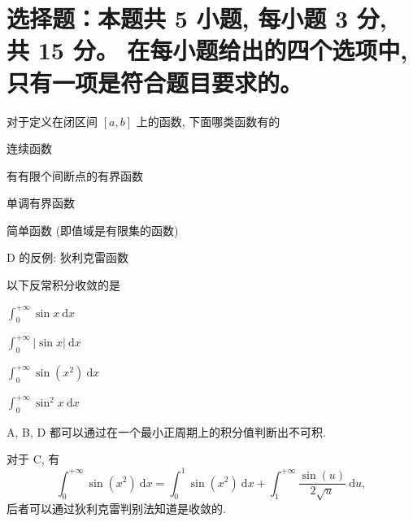 \fi




\section{%
  选择题：本题共 5 小题, 每小题 3 分, 共 15 分。
  在每小题给出的四个选项中, 只有一项是符合题目要求的。
}


\begin{question}
对于定义在闭区间 $[a, b]$ 上的函数, 下面哪类函数有的 \paren[D]

\begin{choices}
\item 连续函数
\item 有有限个间断点的有界函数
\item 单调有界函数
\item 简单函数 (即值域是有限集的函数)
\end{choices}
\end{question}

\begin{solution}
D 的反例: 狄利克雷函数
\end{solution}

\begin{question}
以下反常积分收敛的是 \paren[C]

\begin{choices}
\item $\displaystyle \int_0^{+\infty} \sin x ~ \mathrm{d} x$
\item $\displaystyle \int_0^{+\infty} |\sin x| ~ \mathrm{d} x$
\item $\displaystyle \int_0^{+\infty} \sin (x^2) ~ \mathrm{d} x$
\item $\displaystyle \int_0^{+\infty} \sin^2 x ~ \mathrm{d} x$
\end{choices}
\end{question}

\begin{solution}
A, B, D 都可以通过在一个最小正周期上的积分值判断出不可积.

对于 C, 有
\[\int_0^{+\infty} \sin (x^2) ~ \mathrm{d} x = \int_0^1 \sin (x^2) ~ \mathrm{d} x + \int_1^{+\infty} \dfrac{\sin (u)}{2\sqrt{u}} ~ \mathrm{d} u,\]
后者可以通过狄利克雷判别法知道是收敛的.
\end{solution}

